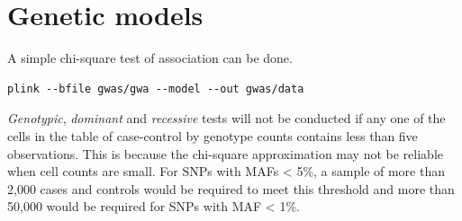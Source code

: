 \documentclass[
]{book}
\newenvironment{Shaded}{\begin{snugshade}}{\end{snugshade}}
\newcommand{\AttributeTok}[1]{\textcolor[rgb]{0.77,0.63,0.00}{#1}}
\newcommand{\ConstantTok}[1]{\textcolor[rgb]{0.00,0.00,0.00}{#1}}
\newcommand{\DecValTok}[1]{\textcolor[rgb]{0.00,0.00,0.81}{#1}}
\newcommand{\FloatTok}[1]{\textcolor[rgb]{0.00,0.00,0.81}{#1}}
\newcommand{\FunctionTok}[1]{\textcolor[rgb]{0.00,0.00,0.00}{#1}}
\newcommand{\NormalTok}[1]{#1}
\newcommand{\OtherTok}[1]{\textcolor[rgb]{0.56,0.35,0.01}{#1}}
\newcommand{\SpecialCharTok}[1]{\textcolor[rgb]{0.00,0.00,0.00}{#1}}
\newcommand{\StringTok}[1]{\textcolor[rgb]{0.31,0.60,0.02}{#1}}
\begin{document}
\begin{Shaded}
\end{Shaded}

\hypertarget{genetic-models}{%
\section{Genetic models}\label{genetic-models}}

A simple chi-square test of association can be done.

\begin{verbatim}
plink --bfile gwas/gwa --model --out gwas/data
\end{verbatim}

\emph{Genotypic}, \emph{dominant} and \emph{recessive} tests will not be conducted if any one of the cells in the table of case-control by genotype counts contains less than five observations. This is because the chi-square approximation may not be reliable when cell counts are small. For SNPs with MAFs \textless{} 5\%, a sample of more than 2,000 cases and controls would be required to meet this threshold and more than 50,000 would be required for SNPs with MAF \textless{} 1\%.
\end{document}
